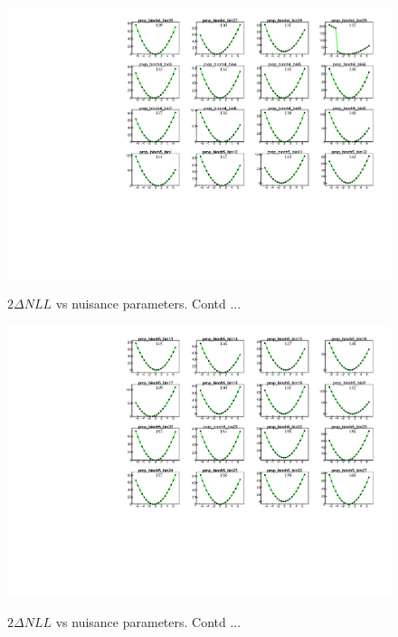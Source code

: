 \begin{figure}
    \centering  
    {\includegraphics[width=1.0\linewidth]{Image/MLFit/ScanNuis/scanNuis9.pdf}}
    \caption{  $2\Delta NLL$ vs nuisance parameters. Contd ...}
    \label{fig:nuisScan9}
\end{figure}
\begin{figure}
    \centering  
    {\includegraphics[width=1.0\linewidth]{Image/MLFit/ScanNuis/scanNuis10.pdf}}
    \caption{  $2\Delta NLL$ vs nuisance parameters. Contd ...}
    \label{fig:nuisScan10}
\end{figure}
